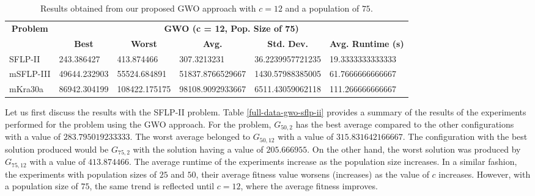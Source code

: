 \begin{table}[h!]
	\begin{adjustwidth}{-1.18in}{}
		\centering
		\begin{tabular}{|l|l|l|l|l|l|}
			\hline
			\multicolumn{1}{|c|}{\multirow{2}{*}{\textbf{Problem}}} & \multicolumn{5}{c|}{\textbf{GWO (c = 12, Pop. Size of 75)}} \\ \cline{2-6} 
			\multicolumn{1}{|c|}{}                                  & \multicolumn{1}{c|}{\textbf{Best}} & \multicolumn{1}{c|}{\textbf{Worst}} & \multicolumn{1}{c|}{\textbf{Avg.}} & \multicolumn{1}{c|}{\textbf{Std. Dev.}} & \multicolumn{1}{c|}{\textbf{Avg. Runtime (s)}} \\ \hline
			SFLP-II                                                 & 243.386427                                  & 413.874466                                   & 307.3213231                      & 36.2239957721235                                 & 19.3333333333333                                  \\ \hline
			mSFLP-III                                               & 49644.232903                                & 55524.684891                                 & 51837.8766529667						         & 1430.57988385005                              & 61.7666666666667                              \\ \hline
			mKra30a                                               & 86942.304199                                & 108422.175175                                 &
			98108.9092933667							&
			6511.43059062118							&
			111.266666666667						\\ \hline
		\end{tabular}
	\end{adjustwidth}
	\caption{Results obtained from our proposed GWO approach with $c = 12$ and a population of $75$.}
	\label{approach-gwo-c12-p75-results}
\end{table}

Let us first discuss the results with the SFLP-II problem. Table \ref{full-data-gwo-sflp-ii} provides a summary of the results of the experiments performed for the problem using the GWO approach. For the problem, $G_{50,2}$ has the best average compared to the other configurations with a value of $283.795019233333$. The worst average belonged to $G_{50,12}$ with a value of $315.831642166667$. The configuration with the best solution produced would be $G_{75,2}$ with the solution having a value of $205.666955$. On the other hand, the worst solution was produced by $G_{75,12}$ with a value of $413.874466$. The average runtime of the experiments increase as the population size increases. In a similar fashion, the experiments with population sizes of $25$ and $50$, their average fitness value worsens (increases) as the value of $c$ increases. However, with a population size of $75$, the same trend is reflected until $c = 12$, where the average fitness improves.

